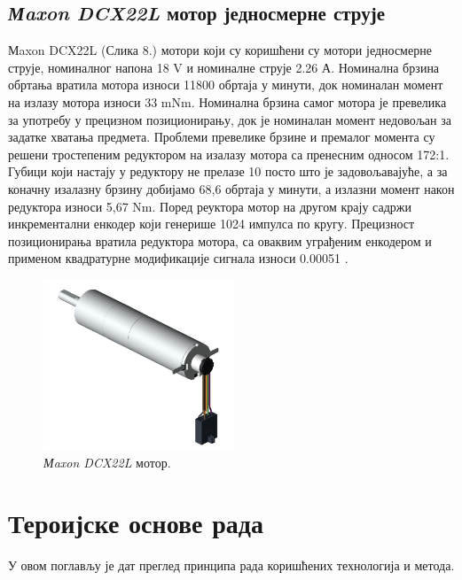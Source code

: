 \documentclass{article}
\begin{document}
\subsection{\textit{Мaxon DCX22L} мотор једносмерне струје} 
Мaxon DCX22L (Слика 8.) мотори који су коришћени су мотори једносмерне струје, номиналног напона 18 V и номиналне струје 2.26 А. Номинална
брзина обртања вратила мотора износи 11800 обртаја у минути, док номиналан момент на излазу мотора износи 33 mNm. Номинална
брзина самог мотора је превелика за употребу у прецизном позиционирању, док је номиналан момент недовољан за задатке хватања предмета.
Проблеми превелике брзине и премалог момента су решени тростепеним редуктором на изалазу мотора са пренесним односом 172:1.
Губици који настају у редуктору не прелазе 10 посто што је задовољавајуће, а за коначну изалазну брзину добијамо 68,6 обртаја 
у минути, а излазни момент након редуктора износи 5,67 Nm. Поред реуктора мотор на другом крају садржи инкрементални енкодер који 
генерише 1024 импулса по кругу. Прецизност позиционирања вратила редуктора мотора, са оваквим уграђеним енкодером и применом 
квадратурне модификације сигнала износи 0.00051 \degree.\\
\begin{figure}[H]
\centering
\includegraphics[height=2in]{Images/Maxon.png}
\caption{\textit{Мaxon DCX22L} мотор.}
\label{fig:figure11}
\end{figure}
\clearpage

\section{Тероијске основе рада}
У овом поглављу је дат преглед принципа рада коришћених технологија и метода. 
\end{document}
